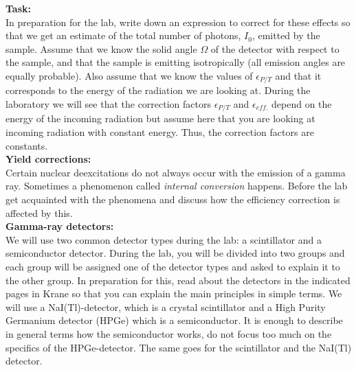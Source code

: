 \documentclass[12pt]{article}
\begin{document}
{\bf\small Task:}\\
In preparation for the lab, write down an expression to correct for
these effects so that we get an estimate of the total number of
photons, $I_0$, emitted by the sample. Assume that we know the solid
angle $\Omega$ of the detector with respect to the sample, and that
the sample is emitting isotropically (all emission angles are equally
probable). Also assume that we know the values of $\epsilon_{P/T}$ and
that it corresponds to the energy of the radiation we are looking
at. During the laboratory we will see that the correction factors
$\epsilon_{P/T}$ and $\epsilon_{eff.}$ depend on the energy of the
incoming radiation but assume here that you are looking at incoming
radiation with constant energy. Thus, the correction factors are
constants.\\

{\bf\small Yield corrections:}\\
Certain nuclear deexcitations do not always occur with the emission of
a gamma ray. Sometimes a phenomenon called {\it internal conversion}
happens. Before the lab get acquainted with the phenomena and discuss
how the efficiency correction is affected by this.\\

{\bf\small Gamma-ray detectors:}\\
We will use two common detector types during the lab: a scintillator
and a semiconductor detector. During the lab, you will be divided into
two groups and each group will be assigned one of the detector types
and asked to explain it to the other group. In preparation for this,
read about the detectors in the indicated pages in
Krane so that you can explain the main principles in simple terms. We
will use a NaI(Tl)-detector, which is a crystal scintillator and a
High Purity Germanium detector (HPGe) which is a semiconductor. It is
enough to describe in general terms how the semiconductor works, do
not focus too much on the specifics of the HPGe-detector. The same goes for the scintillator and the NaI(Tl) detector.
\end{document}
